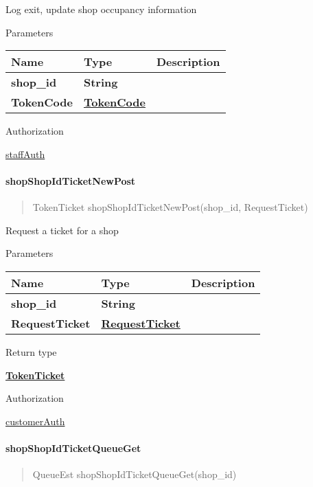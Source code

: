 Log exit, update shop occupancy information

Parameters

\begin{longtable}[]{@{}lll@{}}
\toprule
Name & Type & Description\tabularnewline
\midrule
\endhead
\textbf{shop\_id} & \textbf{String} &\tabularnewline
\textbf{TokenCode} & \href{../Models/TokenCode.md}{\textbf{TokenCode}}
&\tabularnewline
\bottomrule
\end{longtable}

Authorization

\href{../README.md\#staffAuth}{staffAuth}

\hypertarget{shopshopidticketnewpost}{%
\paragraph{\texorpdfstring{\textbf{shopShopIdTicketNewPost}}{shopShopIdTicketNewPost}}\label{shopshopidticketnewpost}}

\begin{quote}
TokenTicket shopShopIdTicketNewPost(shop\_id, RequestTicket)
\end{quote}

Request a ticket for a shop

Parameters

\begin{longtable}[]{@{}lll@{}}
\toprule
Name & Type & Description\tabularnewline
\midrule
\endhead
\textbf{shop\_id} & \textbf{String} &\tabularnewline
\textbf{RequestTicket} &
\href{../Models/RequestTicket.md}{\textbf{RequestTicket}}
&\tabularnewline
\bottomrule
\end{longtable}

Return type

\href{../Models/TokenTicket.md}{\textbf{TokenTicket}}

Authorization

\href{../README.md\#customerAuth}{customerAuth}

\hypertarget{shopshopidticketqueueget}{%
\paragraph{\texorpdfstring{\textbf{shopShopIdTicketQueueGet}}{shopShopIdTicketQueueGet}}\label{shopshopidticketqueueget}}

\begin{quote}
QueueEst shopShopIdTicketQueueGet(shop\_id)
\end{quote}

